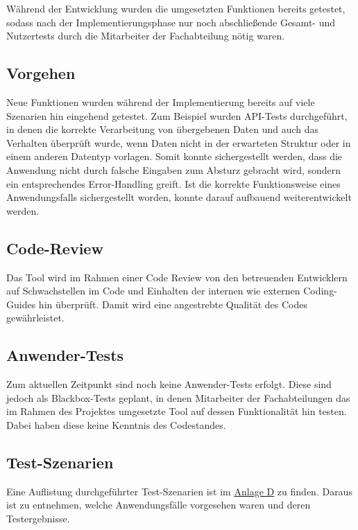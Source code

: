 Während der Entwicklung wurden die umgesetzten Funktionen bereits getestet, sodass nach der Implementierungsphase nur noch abschließende Gesamt- und Nutzertests durch die Mitarbeiter der Fachabteilung nötig waren.

\subsection{Vorgehen}
    Neue Funktionen wurden während der Implementierung bereits auf viele Szenarien hin eingehend getestet. Zum Beispiel wurden API-Tests durchgeführt, in denen die korrekte Verarbeitung von übergebenen Daten und auch das Verhalten überprüft wurde, wenn Daten nicht in der erwarteten Struktur oder in einem anderen Datentyp vorlagen. Somit konnte sichergestellt werden, dass die Anwendung nicht durch falsche Eingaben zum Absturz gebracht wird, sondern ein entsprechendes Error-Handling greift. Ist die korrekte Funktionsweise eines Anwendungsfalls sichergestellt worden, konnte darauf aufbauend weiterentwickelt werden.

\subsection{Code-Review}
    Das Tool wird im Rahmen einer Code Review von den betreuenden Entwicklern auf Schwachstellen im Code und Einhalten der internen wie externen Coding-Guides hin überprüft. Damit wird eine angestrebte Qualität des Codes gewährleistet.

\subsection{Anwender-Tests}
    Zum aktuellen Zeitpunkt sind noch keine Anwender-Tests erfolgt. Diese sind jedoch als Blackbox-Tests geplant, in denen Mitarbeiter der Fachabteilungen das im Rahmen des Projektes umgesetzte Tool auf dessen Funktionalität hin testen. Dabei haben diese keine Kenntnis des Codestandes.

\subsection{Test-Szenarien}
    Eine Auflistung durchgeführter Test-Szenarien ist im \hyperref[anlage:test]{Anlage D} zu finden. Daraus ist zu entnehmen, welche Anwendungsfälle vorgesehen waren und deren Testergebnisse.